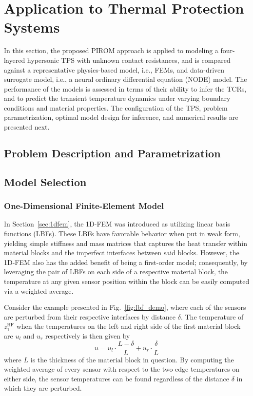 \section{Application to Thermal Protection Systems}

In this section, the proposed PIROM approach is applied to modeling a four-layered hypersonic TPS with unknown contact resistances, and is compared against a representative physics-based model, i.e., FEMs, and data-driven surrogate model, i.e., a neural ordinary differential equation (NODE) model. The performance of the models is assessed in terms of their ability to infer the TCRs, and to predict the transient temperature dynamics under varying boundary conditions and material properties. The configuration of the TPS, problem parametrization, optimal model design for inference, and numerical results are presented next.

\subsection{Problem Description and Parametrization}


\subsection{Model Selection}



\subsubsection{One-Dimensional Finite-Element Model}

In Section~\ref{sec:1dfem}, the 1D-FEM was introduced as utilizing linear basis functions (LBFs). These LBFs have favorable behavior when put in weak form, yielding simple stiffness and mass matrices that captures the heat transfer within material blocks and the imperfect interfaces between said blocks. However, the 1D-FEM also has the added benefit of being a first-order model; consequently, by leveraging the pair of LBFs on each side of a respective material block, the temperature at any given sensor position within the block can be easily computed via a weighted average. 

Consider the example presented in Fig.~\ref{fig:lbf_demo}, where each of the sensors are perturbed from their respective interfaces by distance $\delta$. The temperature of $z_1^{\text{HF}}$ when the temperatures on the left and right side of the first material block are $u_l$ and $u_r$ respectively is then given by
\begin{equation}
    u = u_l \cdot \frac{L-\delta}{L} + u_r \cdot \frac{\delta}{L}
\end{equation}
where $L$ is the thickness of the material block in question. By computing the weighted average of every sensor with respect to the two edge temperatures on either side, the sensor temperatures can be found regardless of the distance $\delta$ in which they are perturbed.

